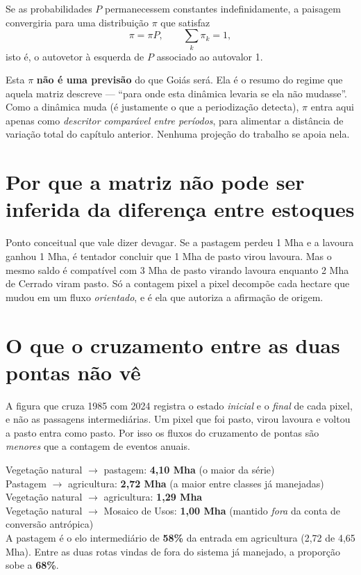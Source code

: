 Se as probabilidades $P$ permanecessem constantes indefinidamente, a paisagem
convergiria para uma distribuição $\pi$ que satisfaz
\begin{equation}
\pi = \pi P, \qquad \sum_k \pi_k = 1,
\end{equation}
isto é, o autovetor à esquerda de $P$ associado ao autovalor 1.

\begin{naodiz}
Esta $\pi$ \textbf{não é uma previsão} do que Goiás será. Ela é o resumo do
regime que aquela matriz descreve --- ``para onde esta dinâmica levaria se ela
não mudasse''. Como a dinâmica muda (é justamente o que a periodização detecta),
$\pi$ entra aqui apenas como \emph{descritor comparável entre períodos}, para
alimentar a distância de variação total do capítulo anterior. Nenhuma projeção
do trabalho se apoia nela.
\end{naodiz}

\section{Por que a matriz não pode ser inferida da diferença entre estoques}

Ponto conceitual que vale dizer devagar. Se a pastagem perdeu 1 Mha e a lavoura
ganhou 1 Mha, é tentador concluir que 1 Mha de pasto virou lavoura. Mas o mesmo
saldo é compatível com 3 Mha de pasto virando lavoura enquanto 2 Mha de Cerrado
viram pasto. Só a contagem pixel a pixel decompõe cada hectare que mudou em um
fluxo \emph{orientado}, e é ela que autoriza a afirmação de origem.

\section{O que o cruzamento entre as duas pontas não vê}

A figura que cruza 1985 com 2024 registra o estado \emph{inicial} e o
\emph{final} de cada pixel, e não as passagens intermediárias. Um pixel que foi
pasto, virou lavoura e voltou a pasto entra como pasto. Por isso os fluxos do
cruzamento de pontas são \emph{menores} que a contagem de eventos anuais.

\begin{ancora}
Vegetação natural $\to$ pastagem: \textbf{4,10 Mha} (o maior da série) \\
Pastagem $\to$ agricultura: \textbf{2,72 Mha} (a maior entre classes já manejadas) \\
Vegetação natural $\to$ agricultura: \textbf{1,29 Mha} \\
Vegetação natural $\to$ Mosaico de Usos: \textbf{1,00 Mha} (mantido \emph{fora}
da conta de conversão antrópica) \\[4pt]
A pastagem é o elo intermediário de \textbf{58\%} da entrada em agricultura
(2,72 de 4,65 Mha). Entre as duas rotas vindas de fora do sistema já manejado,
a proporção sobe a \textbf{68\%}.
\end{ancora}

